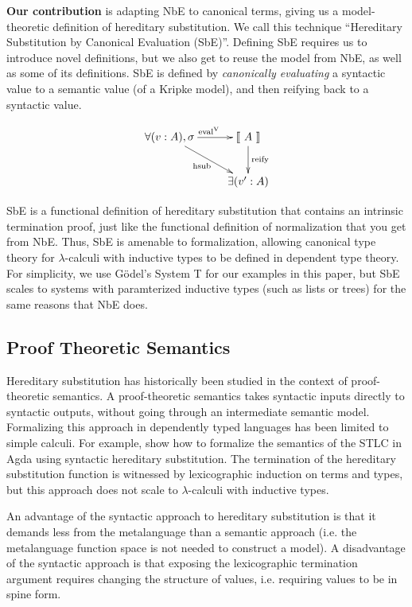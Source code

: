 \documentclass{llncs}
\def\cevalv{\fun{eval}^\con{V}}
\newcommand{\ascribe}[2]{(#1 : #2)}
\newcommand{\els}[1]{\llbracket ~ #1 ~ \rrbracket}
\newcommand{\con}[1]{\textmd{#1}}
\newcommand{\fun}[1]{\textmd{#1}}
\begin{document}
\textbf{Our contribution} is adapting NbE to canonical terms, giving us a model-theoretic
definition of hereditary substitution. We call this technique
``Hereditary Substitution by Canonical Evaluation (SbE)''. Defining
SbE requires us to introduce novel definitions, but we also get to
reuse the model from NbE, as well as some of its definitions. SbE is
defined by \textit{canonically evaluating} a syntactic value to a
semantic value (of a Kripke model), and then reifying back to a syntactic value.

\begin{displaymath}
    \xymatrix{
          \forall{\ascribe{v}{A}, \sigma}
          \ar[dr]_{\fun{hsub}}
          \ar[r]^{\cevalv}
        & {\els{A}}
          \ar[d]^{\large{\fun{reify}}}
\\      & \exists{\ascribe{v'}{A}} }
\end{displaymath}

SbE is a functional definition of hereditary substitution that
contains an intrinsic termination proof, just like the functional
definition of normalization that you get from NbE. Thus, SbE is
amenable to formalization, allowing canonical type theory for
$\lambda$-calculi with inductive types to be defined in dependent type
theory. For simplicity, we use G{\"o}del's System T for our examples
in this paper, but SbE scales to systems with paramterized inductive
types (such as lists or trees) for the same reasons that NbE does.

\subsection{Proof Theoretic Semantics}
\label{sec:proof-theoretic}

Hereditary substitution has historically been studied in the context
of proof-theoretic semantics. A proof-theoretic semantics takes
syntactic inputs directly to syntactic outputs, without going through
an intermediate semantic model. Formalizing this approach in
dependently typed languages has been limited to simple calculi.
For example, \cite{TODO} show how to formalize the
semantics of the STLC in Agda using syntactic hereditary substitution.
The termination of the hereditary substitution function is witnessed
by lexicographic induction on terms and types, but this approach does
not scale to $\lambda$-calculi with inductive types.

An advantage of the syntactic approach to hereditary substitution is
that it demands less from the metalanguage than a semantic
approach (i.e. the metalanguage
function space is not needed to construct a model). A disadvantage of
the syntactic approach is that exposing the lexicographic termination
argument requires changing the structure of values, i.e. requiring
values to be in spine form.
\end{document}
